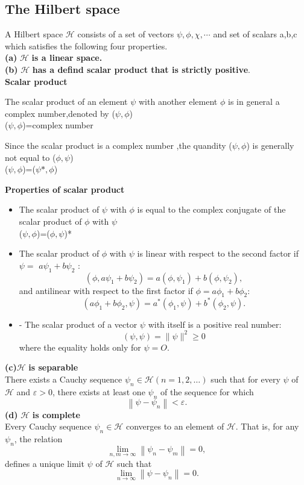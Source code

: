 \subsection{The Hilbert space}
A Hilbert space $\mathcal{H}$ consists of a set of vectors $\psi,\phi,\chi,\cdots$ and set of scalars a,b,c which satisfies the following four properties.\\
\textbf{(a)} $\mathcal{H}$ \textbf{is a linear space.}\\
\textbf{(b)} $\mathcal{H}$ \textbf{has a defind scalar product that is strictly positive}.\\
\textbf{Scalar product}
  \par The scalar product of an element $\psi$ with another element $\phi$ is in general a complex number,denoted by ($\psi,\phi$) \\
  ($\psi,\phi$)=complex number
  \begin{note}
  	Since the scalar product is a complex number ,the quandity ($\psi,\phi$) is generally not equal to ($\phi,\psi$)\\
  	($\psi,\phi$)=($\psi*,\phi$)
  \end{note}
\textbf{Properties of scalar product}
\begin{itemize}
	\item The scalar product of $\psi$ with $\phi$ is equal to the complex conjugate of the scalar product of $\phi$ with $\psi$\\
	($\psi,\phi$)=($\phi,\psi$)*
	\item The scalar product of $\phi$ with $\psi$ is linear with respect to the second factor if $\psi=$ $a \psi_{1}+b \psi_{2}$ :
	$$
	\left(\phi, a \psi_{1}+b \psi_{2}\right)=a\left(\phi, \psi_{1}\right)+b\left(\phi, \psi_{2}\right),
	$$
	and antilinear with respect to the first factor if $\phi=a \phi_{1}+b \phi_{2}:$
	$$
	\left(a \phi_{1}+b \phi_{2}, \psi\right)=a^{*}\left(\phi_{1}, \psi\right)+b^{*}\left(\phi_{2}, \psi\right) .
	$$
	\item - The scalar product of a vector $\psi$ with itself is a positive real number:
	$$
	(\psi, \psi)=\|\psi\|^{2} \geq 0
	$$
	where the equality holds only for $\psi=O$.
\end{itemize}
\textbf{(c)}$\mathcal{H}$ \textbf{is separable}\\
There exists a Cauchy sequence $\psi_{n} \in \mathcal{H}(n=1,2, \ldots)$ such that for every $\psi$ of $\mathcal{H}$ and $\varepsilon>0$, there exists at least one $\psi_{n}$ of the sequence for which
$$
\left\|\psi-\psi_{n}\right\|<\varepsilon .
$$
\textbf{(d)} $\mathcal{H}$ \textbf{is complete}\\
Every Cauchy sequence $\psi_{n} \in \mathcal{H}$ converges to an element of $\mathcal{H}$. That is, for any $\psi_{n}$, the relation
$$
\lim _{n, m \rightarrow \infty}\left\|\psi_{n}-\psi_{m}\right\|=0,
$$
defines a unique limit $\psi$ of $\mathcal{H}$ such that
$$
\lim _{n \rightarrow \infty}\left\|\psi-\psi_{n}\right\|=0 .
$$
